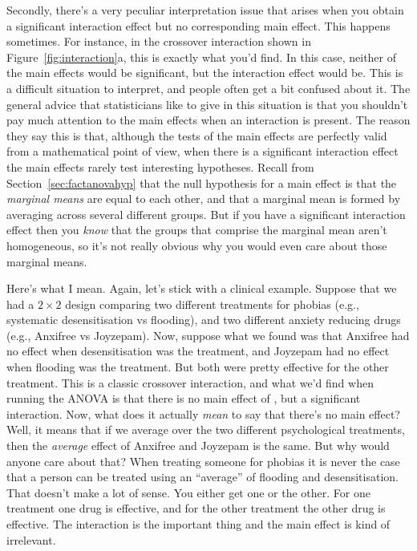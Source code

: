 Secondly, there's a very peculiar interpretation issue that arises when you obtain a significant interaction effect but no corresponding main effect. This happens sometimes. For instance, in the crossover interaction shown in Figure~\ref{fig:interaction}a, this is exactly what you'd find. In this case, neither of the main effects would be significant, but the interaction effect would be. This is a difficult situation to interpret, and people often get a bit confused about it. The general advice that statisticians like to give in this situation is that you shouldn't pay much attention to the main effects when an interaction is present. The reason they say this is that, although the tests of the main effects are perfectly valid from a mathematical point of view, when there is a significant interaction effect the main effects rarely test interesting hypotheses. Recall from Section~\ref{sec:factanovahyp} that the null hypothesis for a main effect is that the {\it marginal means} are equal to each other, and that a marginal mean is formed by averaging across several different groups. But if you have a significant interaction effect then you {\it know} that the groups that comprise the marginal mean aren't homogeneous, so it's not really obvious why you would even care about those marginal means. 

Here's what I mean. Again, let's stick with a clinical example. Suppose that we had a $2 \times 2$ design comparing two different treatments for phobias (e.g., systematic desensitisation vs flooding), and two different anxiety reducing drugs (e.g., Anxifree vs Joyzepam). Now, suppose what we found was that Anxifree had no effect when desensitisation was the treatment, and Joyzepam had no effect when flooding was the treatment. But both were pretty effective for the other treatment. This is a classic crossover interaction, and what we'd find when running the ANOVA is that there is no main effect of , but a significant interaction. Now, what does it actually {\it mean} to say that there's no main effect? Well, it means that if we average over the two different psychological treatments, then the {\it average} effect of Anxifree and Joyzepam is the same. But why would anyone care about that? When treating someone for phobias it is never the case that a person can be treated using an ``average'' of flooding and desensitisation. That doesn't make a lot of sense. You either get one or the other. For one treatment one drug is effective, and for the other treatment the other drug is effective. The interaction is the important thing and the main effect is kind of irrelevant. 

